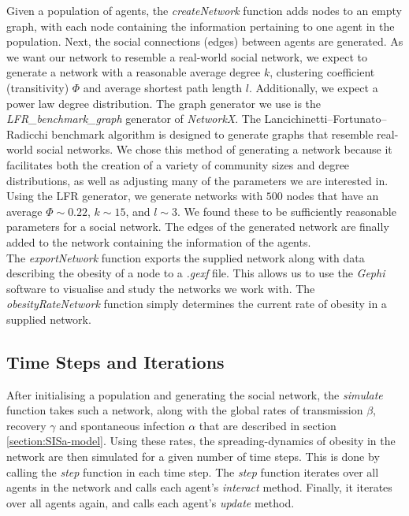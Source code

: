 \documentclass[11pt]{article}
\begin{document}
Given a population of agents, the \textit{createNetwork} function adds nodes to an empty graph, with each node containing the information pertaining to one agent in the population. Next, the social connections (edges) between agents are generated. As we want our network to resemble a real-world social network, we expect to generate a network with a reasonable average degree \(k\), clustering coefficient (transitivity) \(\Phi\) and average shortest path length \(l\). Additionally, we expect a power law degree distribution. The graph generator we use is the \textit{LFR\_benchmark\_graph} generator of \textit{NetworkX}.
The Lancichinetti–Fortunato–Radicchi benchmark algorithm is designed to generate graphs that resemble real-world social networks\cite{Lancichinetti_2008}. 
We chose this method of generating a network because it facilitates both the creation of a variety of community sizes and degree distributions, as well as adjusting many of the parameters we are interested in.
Using the LFR generator, we generate networks with \(500\) nodes that have an average \(\Phi \sim 0.22\), \(k \sim 15\), and \(l \sim 3\). We found these to be sufficiently reasonable parameters for a social network. The edges of the generated network are finally added to the network containing the information of the agents. \\

The \textit{exportNetwork} function exports the supplied network along with data describing the obesity of a node to a \textit{.gexf} file.
This allows us to use the \textit{Gephi} software to visualise and study the networks we work with. The \textit{obesityRateNetwork} function simply determines the current rate of obesity in a supplied network.

\subsection{Time Steps and Iterations} \label{section:iterations}

After initialising a population and generating the social network, the \textit{simulate} function takes such a network, along with the global rates of transmission \(\beta\), recovery \(\gamma\) and spontaneous infection \(\alpha\) that are described in section \ref{section:SISa-model}.
Using these rates,  the spreading-dynamics of obesity in the network are then simulated for a given number of time steps.
This is done by calling the \textit{step} function in each time step. The \textit{step} function iterates over all agents in the network and calls each agent's \textit{interact} method. Finally, it iterates over all agents again, and calls each agent's \textit{update} method. \\
\end{document}
